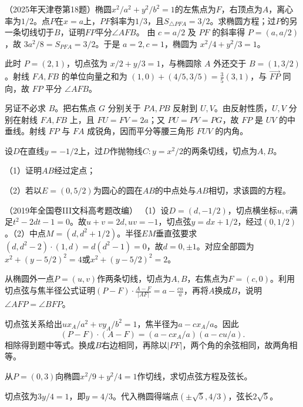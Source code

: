 （2025年天津卷第18题）椭圆\(x^2/a^2+y^2/b^2=1\)的左焦点为\(F\)，右顶点为\(A\)，离心率为\(1/2\)。点\(P\)在\(x=a\)上，\(PF\)斜率为\(1/3\)，且\(S_{\triangle PFA}=3/2\)。求椭圆方程；过\(P\)的另一条切线切于\(B\)，证明\(FP\)平分\(\angle AFB\)。
\solutionanswer
由 \(c=a/2\) 及 \(PF\) 的斜率得 \(P=(a,a/2)\)，故 \(3a^2/8=S_{PFA}=3/2\)。于是 \(a=2,c=1\)，椭圆为 \(x^2/4+y^2/3=1\)。

此时 \(P=(2,1)\)，切点弦为 \(x/2+y/3=1\)，与椭圆除 \(A\) 外还交于 \(B=(1,3/2)\)。射线 \(FA,FB\) 的单位向量之和为 \((1,0)+(4/5,3/5)=\tfrac35(3,1)\)，与 \(\overrightarrow{FP}\) 同向，故 \(FP\) 平分 \(\angle AFB\)。

另证不必求 \(B\)。把右焦点 \(G\) 分别关于 \(PA,PB\) 反射到 \(U,V\)。由反射性质，\(U,V\) 分别在射线 \(FA,FB\) 上，且 \(FU=FV=2a\)；又 \(PU=PV=PG\)，故 \(FP\) 是 \(UV\) 的中垂线。射线 \(FP\) 与 \(FA\) 成锐角，因而平分等腰三角形 \(FUV\) 的内角。


设\(D\)在直线\(y=-1/2\)上，过\(D\)作抛物线\(C:y=x^2/2\)的两条切线，切点为\(A,B\)。

（1）证明\(AB\)经过定点；

（2）若以\(E=(0,5/2)\)为圆心的圆在\(AB\)的中点处与\(AB\)相切，求该圆的方程。

（2019年全国卷III文科高考题改编）
\solutionanswer
（1）设\(D=(d,-1/2)\)，切点横坐标\(u,v\)满足\(t^2-2dt-1=0\)。故\(u+v=2d,uv=-1\)，切点弦\(y=dx+1/2\)，经过\((0,1/2)\)。（2）中点\(M=(d,d^2+1/2)\)。半径\(EM\)垂直弦要求\((d,d^2-2)\cdot(1,d)=d(d^2-1)=0\)，故\(d=0,\pm1\)。对应全部圆为\(x^2+(y-5/2)^2=4\)或\(x^2+(y-5/2)^2=2\)。


从椭圆外一点\(P=(u,v)\)作两条切线，切点为\(A,B\)，右焦点为\(F=(c,0)\)。利用切点弦与焦半径公式证明\(\displaystyle (P-F)\cdot\frac{A-F}{|AF|}=a-\frac{cu}{a}\)，再将\(A\)换成\(B\)，说明\(\angle AFP=\angle BFP\)。
\par
\solutionanswer
切点弦关系给出\(ux_A/a^2+vy_A/b^2=1\)，焦半径为\(a-cx_A/a\)。因此
\[
(P-F)\cdot(A-F)=(a-cx_A/a)(a-cu/a).
\]
相除得到题中等式。换成\(B\)右边相同，再除以\(|PF|\)，两个角的余弦相同，故两角相等。


从\(P=(0,3)\)向椭圆\(x^2/9+y^2/4=1\)作切线，求切点弦方程及弦长。
\par
\solutionanswer
切点弦为\(3y/4=1\)，即\(y=4/3\)。代入椭圆得端点\((\pm\sqrt5,4/3)\)，弦长\(2\sqrt5\)。


